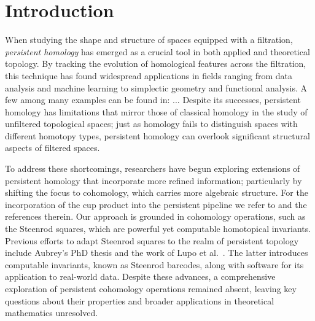 
\section{Introduction} \label{s:introduction}

When studying the shape and structure of spaces equipped with a filtration, \textit{persistent homology} has emerged as a crucial tool in both applied and theoretical topology.
By tracking the evolution of homological features across the filtration, this technique has found widespread applications in fields ranging from data analysis and machine learning to simplectic geometry and functional analysis.
A few among many examples can be found in: ...
Despite its successes, persistent homology has limitations that mirror those of classical homology in the study of unfiltered topological spaces; just as homology fails to distinguish spaces with different homotopy types, persistent homology can overlook significant structural aspects of filtered spaces.


To address these shortcomings, researchers have begun exploring extensions of persistent homology that incorporate more refined information; particularly by shifting the focus to cohomology, which carries more algebraic structure.
For the incorporation of the cup product into the persistent pipeline we refer to \cite{memoli2024persistent} and the references therein.
Our approach is grounded in cohomology operations, such as the Steenrod squares, which are powerful yet computable homotopical invariants.
Previous efforts to adapt Steenrod squares to the realm of persistent topology include Aubrey's PhD thesis \cite{aubrey2011thesis} and the work of Lupo et al.\ \cite{medina2022per_st}.
The latter introduces computable invariants, known as Steenrod barcodes, along with software for its application to real-world data.
Despite these advances, a comprehensive exploration of persistent cohomology operations remained absent, leaving key questions about their properties and broader applications in theoretical mathematics unresolved.

